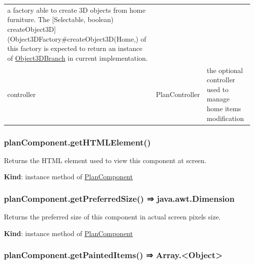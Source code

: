 \documentclass[a4paper]{report}
\begin{document}
\begin{longtable}[]{@{}lll@{}}
\begin{minipage}[t]{0.30\columnwidth}
a factory able to create 3D objects from home furniture. The
{[}Selectable, boolean)
createObject3D{]}(Object3DFactory\#createObject3D(Home,) of this factory
is expected to return an instance of \url{Object3DBranch} in current
implementation.\strut
\end{minipage}\tabularnewline
\begin{minipage}[t]{0.30\columnwidth}\raggedright
controller\strut
\end{minipage} & \begin{minipage}[t]{0.30\columnwidth}\raggedright
PlanController\strut
\end{minipage} & \begin{minipage}[t]{0.30\columnwidth}\raggedright
the optional controller used to manage home items modification\strut
\end{minipage}\tabularnewline
\bottomrule
\end{longtable}

\hypertarget{plancomponent.gethtmlelement}{%
\subsubsection{planComponent.getHTMLElement()}\label{plancomponent.gethtmlelement}}

Returns the HTML element used to view this component at screen.

\textbf{Kind}: instance method of
\protect\hyperlink{PlanComponent}{PlanComponent}\\

\hypertarget{plancomponent.getpreferredsize-java.awt.dimension}{%
\subsubsection{planComponent.getPreferredSize() ⇒
java.awt.Dimension}\label{plancomponent.getpreferredsize-java.awt.dimension}}

Returns the preferred size of this component in actual screen pixels
size.

\textbf{Kind}: instance method of
\protect\hyperlink{PlanComponent}{PlanComponent}\\

\hypertarget{plancomponent.getpainteditems-array.object}{%
\subsubsection{planComponent.getPaintedItems() ⇒
Array.\textless Object\textgreater{}}\label{plancomponent.getpainteditems-array.object}}
\end{document}
